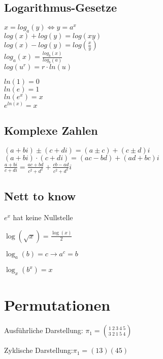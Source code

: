 \documentclass[a4paper,landscape, 11pt]{article}
\begin{document}
\begin{multicols}{5}
\begin{small}
         \subsection{Logarithmus-Gesetze}
            \noindent
            $x = log_a(y) \Leftrightarrow y = a^x$\\
            $log(x) + log(y) = log(xy)$\\
            $log(x) - log(y) = log(\frac{x}{y})$\\
            $log_a(x) = \frac{log_b(x)}{log_b(a)}$  \\
            $log(u^r) = r \cdot ln(u)$
            \begin{multicols}{2}
            \noindent
            $ln(1) = 0$ \\
            $ln(e) = 1$ \\
            $ln(e^x) = x$ \\
            $e^{ln(x)} = x$
            \end{multicols}
        \subsection{Komplexe Zahlen}
        $(a + bi) \pm (c + di) = (a \pm c) + (c \pm d)i$\\
        $(a + bi) \cdot (c + di) = (ac - bd) + (ad + bc)i$\\
    
        $\displaystyle \frac{a + bi}{c + di} = \frac{ac + bd}{c^2 + d^2} + \frac{cb - ad}{c^2 + d^2}i$
        \subsection{Nett to know}
        \begin{compactitem}
        \item {$e^x$ hat keine Nullstelle}
        \item {$\log(\sqrt{x}) = \frac{\log(x)}{2}$}
        \item {$\log_a(b)=c \rightarrow a^c=b$}
        \item {$\log_x(b^x)=x$}
        \end{compactitem}
    \section{Permutationen}
    Ausführliche Darstellung: $\pi_1=\binom{1\ 2\ 3\ 4\ 5}{3\ 2\ 1\ 5\ 4}$
    
    Zyklische Darstellung:$\pi_1=(13)(45)$
    

\end{small}
\end{multicols}
\end{document}
